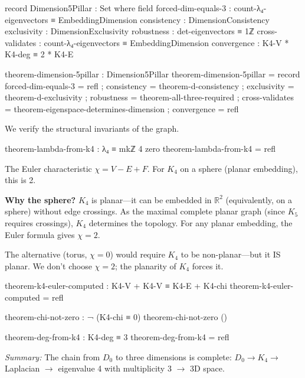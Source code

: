 \documentclass[11pt,a4paper]{book}
\begin{document}
\begin{code}
record Dimension5Pillar : Set where
  field
    forced-dim-equals-3 : count-λ₄-eigenvectors ≡ EmbeddingDimension
    consistency     : DimensionConsistency
    exclusivity     : DimensionExclusivity
    robustness      : det-eigenvectors ≡ 1ℤ
    cross-validates : count-λ₄-eigenvectors ≡ EmbeddingDimension
    convergence     : K4-V * K4-deg ≡ 2 * K4-E

theorem-dimension-5pillar : Dimension5Pillar
theorem-dimension-5pillar = record
  { forced-dim-equals-3 = refl
  ; consistency     = theorem-d-consistency
  ; exclusivity     = theorem-d-exclusivity
  ; robustness      = theorem-all-three-required
  ; cross-validates = theorem-eigenspace-determines-dimension
  ; convergence     = refl
  }

\end{code}

We verify the structural invariants of the graph.

\begin{code}
theorem-lambda-from-k4 : λ₄ ≡ mkℤ 4 zero
theorem-lambda-from-k4 = refl

\end{code}

The Euler characteristic $\chi = V - E + F$. For $K_4$ on a sphere (planar embedding), this is 2.

\textbf{Why the sphere?} $K_4$ is planar---it can be embedded in $\mathbb{R}^2$ (equivalently, on a sphere) 
without edge crossings. As the maximal complete planar graph 
(since $K_5$ requires crossings), $K_4$ determines the topology. For any planar embedding, the Euler formula gives $\chi = 2$.

The alternative (torus, $\chi = 0$) would require $K_4$ to be non-planar---but it IS planar. 
We don't choose $\chi = 2$; the planarity of $K_4$ forces it.

\begin{code}
theorem-k4-euler-computed : K4-V + K4-V ≡ K4-E + K4-chi
theorem-k4-euler-computed = refl

theorem-chi-not-zero : ¬ (K4-chi ≡ 0)
theorem-chi-not-zero ()

\end{code}

\begin{code}
theorem-deg-from-k4 : K4-deg ≡ 3
theorem-deg-from-k4 = refl

\end{code}

\medskip
\noindent\textit{Summary:} The chain from $D_0$ to three dimensions is complete: 
$D_0 \to K_4 \to$ Laplacian $\to$ eigenvalue 4 with multiplicity 3 $\to$ 3D space.
\end{document}
